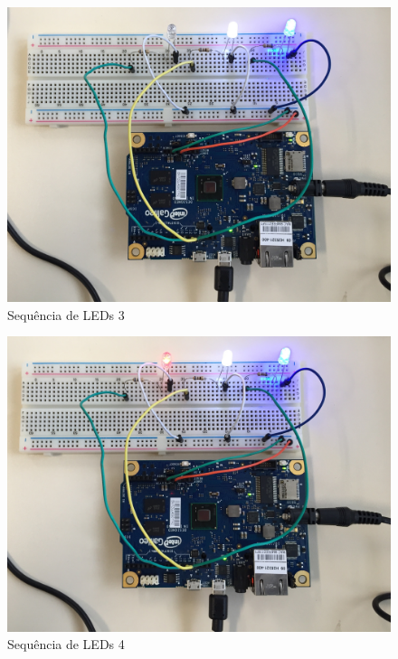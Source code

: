 \begin{figure}[h]
\centering
\includegraphics[scale=0.05]{chapter2/real3.jpg}
\caption{Sequência de LEDs 3}
\label{fig:5}
\end{figure}
\begin{figure}[h]
\centering
\includegraphics[scale=0.05]{chapter2/real.jpg}
\caption{Sequência de LEDs 4}
\label{fig:6}
\end{figure}
